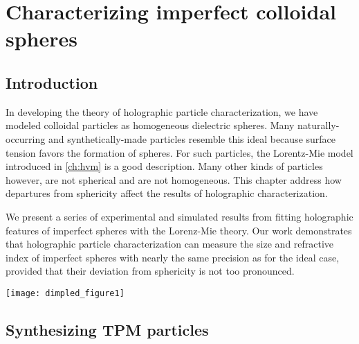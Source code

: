 \chapter{Characterizing imperfect colloidal spheres}
\label{ch:dimpled}

\section{Introduction}
In developing the theory of holographic particle characterization, we have modeled
colloidal particles as homogeneous
dielectric spheres. Many naturally-occurring and synthetically-made particles
resemble this ideal because surface tension favors the formation of spheres.
For such particles, the Lorentz-Mie model introduced in \autoref{ch:hvm} is a
good description. Many other kinds of particles however, are not spherical and
are not homogeneous. This chapter address how departures from sphericity
affect the results of holographic characterization.

We present a series of experimental and simulated results from fitting
holographic features of imperfect spheres with the Lorenz-Mie theory.
Our work demonstrates that holographic particle characterization
can measure the size and refractive index
of imperfect spheres with nearly the same precision as for the ideal
case, provided that their
deviation from sphericity is not too pronounced. 

\begin{figure*}[t]
  \centering
  \texttt{[image: dimpled\_figure1]}
  \caption{(a) Scanning electron micrograph of a colloidal TPM sphere and 
    (b) a dimpled sphere.  Scale bars represent \SI{500}{\nm}.
    (c) and (d) Corresponding holograms for
    particles from the samples show in (a) and (b).  (e) \num{5000} measurements
    of sphere radius and refractive index for a single
    TPM sphere held in an optical tweezer.  Each point represents
    a single measurement, and is colored according to the
    relative density of measurements, $P(a_p,n_p)$.  (f) equivalent result for
    a dimpled sphere.  (g) \num{5000} measurements of the radius and
    refractive index of a freely diffusing sphere.  (h) Equivalent
    result for a dimpled sphere \cite{hannel15}.
   }
  \label{fig:singleparticle}
\end{figure*}

\section{Synthesizing TPM particles}

